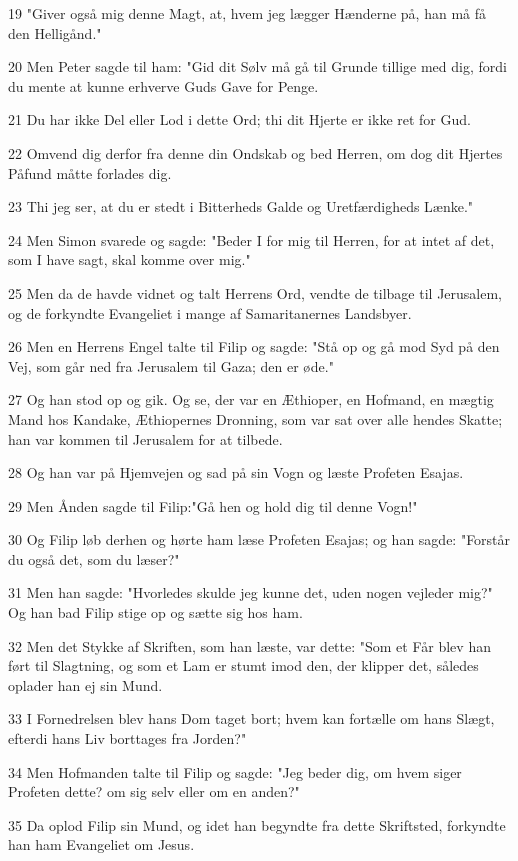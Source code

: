 \par 19 "Giver også mig denne Magt, at, hvem jeg lægger Hænderne på, han må få den Helligånd."
\par 20 Men Peter sagde til ham: "Gid dit Sølv må gå til Grunde tillige med dig, fordi du mente at kunne erhverve Guds Gave for Penge.
\par 21 Du har ikke Del eller Lod i dette Ord; thi dit Hjerte er ikke ret for Gud.
\par 22 Omvend dig derfor fra denne din Ondskab og bed Herren, om dog dit Hjertes Påfund måtte forlades dig.
\par 23 Thi jeg ser, at du er stedt i Bitterheds Galde og Uretfærdigheds Lænke."
\par 24 Men Simon svarede og sagde: "Beder I for mig til Herren, for at intet af det, som I have sagt, skal komme over mig."
\par 25 Men da de havde vidnet og talt Herrens Ord, vendte de tilbage til Jerusalem, og de forkyndte Evangeliet i mange af Samaritanernes Landsbyer.
\par 26 Men en Herrens Engel talte til Filip og sagde: "Stå op og gå mod Syd på den Vej, som går ned fra Jerusalem til Gaza; den er øde."
\par 27 Og han stod op og gik. Og se, der var en Æthioper, en Hofmand, en mægtig Mand hos Kandake, Æthiopernes Dronning, som var sat over alle hendes Skatte; han var kommen til Jerusalem for at tilbede.
\par 28 Og han var på Hjemvejen og sad på sin Vogn og læste Profeten Esajas.
\par 29 Men Ånden sagde til Filip:"Gå hen og hold dig til denne Vogn!"
\par 30 Og Filip løb derhen og hørte ham læse Profeten Esajas; og han sagde: "Forstår du også det, som du læser?"
\par 31 Men han sagde: "Hvorledes skulde jeg kunne det, uden nogen vejleder mig?" Og han bad Filip stige op og sætte sig hos ham.
\par 32 Men det Stykke af Skriften, som han læste, var dette: "Som et Får blev han ført til Slagtning, og som et Lam er stumt imod den, der klipper det, således oplader han ej sin Mund.
\par 33 I Fornedrelsen blev hans Dom taget bort; hvem kan fortælle om hans Slægt, efterdi hans Liv borttages fra Jorden?"
\par 34 Men Hofmanden talte til Filip og sagde: "Jeg beder dig, om hvem siger Profeten dette? om sig selv eller om en anden?"
\par 35 Da oplod Filip sin Mund, og idet han begyndte fra dette Skriftsted, forkyndte han ham Evangeliet om Jesus.
